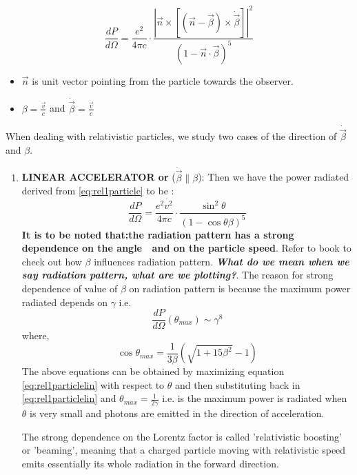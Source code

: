 \documentclass[11pt]{report}
\newcommand{\tbf}[1]{\textbf{#1}}
\newcommand{\tit}[1]{\textit{#1}}
\newcommand{\de}[2]{\frac{d{#1}}{d{#2}}}
\newcommand{\cbox}{tcolorbox}
\newcommand{\cc}[1]{\left({#1}\right)}
\newcommand{\rr}[1]{\left[{#1}\right]}
\newcommand{\vd}[1]{\dot{\vec{#1}}}
\begin{document}
\begin{equation}\label{eq:rel1particle}
\de{P}{\Omega}=\frac{e^2}{4 \pi c} \cdot \frac{|\vec{n}\times \rr{(\vec{n}-\vec{\beta})\times\dot{\vec{\beta}}}|^2}{(1- \vec{n}\cdot \vec{\beta})^5}
\end{equation}
\begin{itemize}
\item $\vec{n}$ is unit vector pointing from the particle towards the observer.
\item $\beta=\frac{\vec{v}}{c}$ and $\vd{\beta}=\frac{\vd{v}}{c}$
\end{itemize}
When dealing with relativistic particles, we study two cases of the direction of $\vd{\beta}$ and $\beta$.
\begin{enumerate}
\item \tbf{LINEAR ACCELERATOR or }($\vd{\beta} \parallel \beta$):
Then we have the power radiated derived from \eqref{eq:rel1particle} to be :
\begin{equation}\label{eq:rel1particlelin}
\de{P}{\Omega}=\frac{e^2 \dot{v^2}}{4 \pi c} \cdot \frac{\sin^2 \theta}{(1- \cos \theta \beta)^5}
\end{equation}
\tbf{It is to be noted that:the radiation pattern has a strong dependence on the angle  and on the particle speed}. Refer to book to check out how $\beta$ influences radiation pattern. \tbf{\tit{What do we mean when we say radiation pattern, what are we plotting?}}.
The reason for strong dependence of value of $\beta$ on radiation pattern is because the maximum power radiated depends on $\gamma$ i.e.
\begin{equation}
\de{P}{\Omega}(\theta_{max}) \sim \gamma^8
\end{equation}
where,
\begin{equation}
\cos \theta_{max}=\frac{1}{3 \beta}\cc{\sqrt{1+15 \beta^2}-1}
\end{equation}
The above equations can be obtained by maximizing equation \eqref{eq:rel1particlelin} with respect to $\theta$ and then substituting  back in \eqref{eq:rel1particlelin} and $\theta_{max}=\frac{1}{2\gamma}$ i.e. is the maximum power is radiated when $\theta$ is very small and photons are emitted in the direction of acceleration.
\begin{\cbox}
The strong dependence on the Lorentz factor is called 'relativistic boosting' or 'beaming', meaning that a charged particle moving with relativistic speed emits essentially its whole radiation in the forward direction. 
\end{\cbox} 


\end{enumerate}
\end{document}
